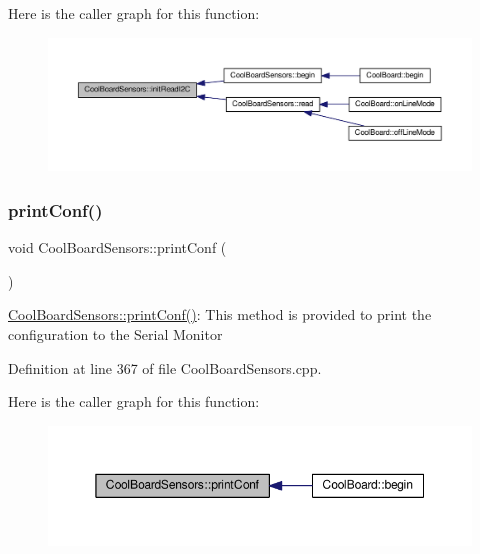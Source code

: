 Here is the caller graph for this function\+:\nopagebreak
\begin{figure}[H]
\begin{center}
\leavevmode
\includegraphics[width=350pt]{class_cool_board_sensors_acad6a8418c66d36868caca23c844ecb6_icgraph}
\end{center}
\end{figure}
\mbox{\label{class_cool_board_sensors_af6fd79505815b204c178617ecf54c873}} 
\subsubsection{\texorpdfstring{print\+Conf()}{printConf()}}
{\footnotesize\ttfamily void Cool\+Board\+Sensors\+::print\+Conf (\begin{DoxyParamCaption}{ }\end{DoxyParamCaption})}

\hyperlink{class_cool_board_sensors_af6fd79505815b204c178617ecf54c873}{Cool\+Board\+Sensors\+::print\+Conf()}\+: This method is provided to print the configuration to the Serial Monitor 

Definition at line 367 of file Cool\+Board\+Sensors.\+cpp.

Here is the caller graph for this function\+:\nopagebreak
\begin{figure}[H]
\begin{center}
\leavevmode
\includegraphics[width=350pt]{class_cool_board_sensors_af6fd79505815b204c178617ecf54c873_icgraph}
\end{center}
\end{figure}
\mbox{\label{class_cool_board_sensors_a91badb2539d91fda8679f2a597874c48}} 
